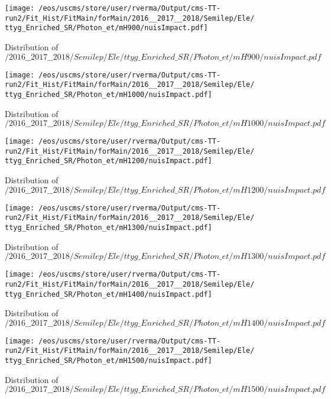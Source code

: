 \begin{figure}
\centering
\texttt{[image: /eos/uscms/store/user/rverma/Output/cms-TT-run2/Fit\_Hist/FitMain/forMain/2016\_\_2017\_\_2018/Semilep/Ele/ttyg\_Enriched\_SR/Photon\_et/mH900/nuisImpact.pdf]}
\caption{Distribution of $/2016\_\_2017\_\_2018/Semilep/Ele/ttyg\_Enriched\_SR/Photon\_et/mH900/nuisImpact.pdf$}
\end{figure}

\begin{figure}
\centering
\texttt{[image: /eos/uscms/store/user/rverma/Output/cms-TT-run2/Fit\_Hist/FitMain/forMain/2016\_\_2017\_\_2018/Semilep/Ele/ttyg\_Enriched\_SR/Photon\_et/mH1000/nuisImpact.pdf]}
\caption{Distribution of $/2016\_\_2017\_\_2018/Semilep/Ele/ttyg\_Enriched\_SR/Photon\_et/mH1000/nuisImpact.pdf$}
\end{figure}

\begin{figure}
\centering
\texttt{[image: /eos/uscms/store/user/rverma/Output/cms-TT-run2/Fit\_Hist/FitMain/forMain/2016\_\_2017\_\_2018/Semilep/Ele/ttyg\_Enriched\_SR/Photon\_et/mH1200/nuisImpact.pdf]}
\caption{Distribution of $/2016\_\_2017\_\_2018/Semilep/Ele/ttyg\_Enriched\_SR/Photon\_et/mH1200/nuisImpact.pdf$}
\end{figure}

\begin{figure}
\centering
\texttt{[image: /eos/uscms/store/user/rverma/Output/cms-TT-run2/Fit\_Hist/FitMain/forMain/2016\_\_2017\_\_2018/Semilep/Ele/ttyg\_Enriched\_SR/Photon\_et/mH1300/nuisImpact.pdf]}
\caption{Distribution of $/2016\_\_2017\_\_2018/Semilep/Ele/ttyg\_Enriched\_SR/Photon\_et/mH1300/nuisImpact.pdf$}
\end{figure}

\begin{figure}
\centering
\texttt{[image: /eos/uscms/store/user/rverma/Output/cms-TT-run2/Fit\_Hist/FitMain/forMain/2016\_\_2017\_\_2018/Semilep/Ele/ttyg\_Enriched\_SR/Photon\_et/mH1400/nuisImpact.pdf]}
\caption{Distribution of $/2016\_\_2017\_\_2018/Semilep/Ele/ttyg\_Enriched\_SR/Photon\_et/mH1400/nuisImpact.pdf$}
\end{figure}

\begin{figure}
\centering
\texttt{[image: /eos/uscms/store/user/rverma/Output/cms-TT-run2/Fit\_Hist/FitMain/forMain/2016\_\_2017\_\_2018/Semilep/Ele/ttyg\_Enriched\_SR/Photon\_et/mH1500/nuisImpact.pdf]}
\caption{Distribution of $/2016\_\_2017\_\_2018/Semilep/Ele/ttyg\_Enriched\_SR/Photon\_et/mH1500/nuisImpact.pdf$}
\end{figure}

